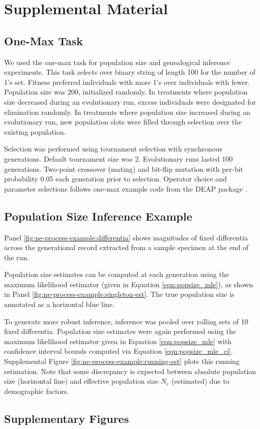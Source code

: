 \section{Supplemental Material}

\subsection{One-Max Task}
\label{sec:one-max}

We used the one-max task for population size and genealogical inference experiments.
This task selects over binary string of length 100 for the number of 1's set.
Fitness preferred individuals with more 1's over individuals with fewer.
Population size was 200, initialized randomly.
In treatments where population size decreased during an evolutionary run, excess individuals were designated for elimination randomly.
In treatments where population size increased during an evolutionary run,
new population slots were filled through selection over the existing population.

Selection was performed using tournament selection with synchronous generations.
Default tournament size was 2.
Evolutionary runs lasted 100 generations.
Two-point crossover (mating) and bit-flip mutation with per-bit probability 0.05 each generation prior to selection.
Operator choice and parameter selections follows one-max example code from the DEAP package \citep{fortin2012deap}.

\subsection{Population Size Inference Example}
\label{sec:population-size-inference-example}



Panel \ref{fig:ne-process-example:differentia} shows magnitudes of fixed differentia across the generational record extracted from a sample specimen at the end of the run.

Population size estimates can be computed at each generation using the maximum likelihood estimator (given in Equation \ref{eqn:popsize_mle}), as shown in Panel \ref{fig:ne-process-example:singleton-est}.
The true population size is annotated as a horizontal blue line.

To generate more robust inference, inference was pooled over rolling sets of 10 fixed differentia.
Population size estimates were again performed using the maximum likelihood estimator given in Equation \ref{eqn:popsize_mle} with confidence interval bounds computed via Equation \ref{eqn:popsize_mle_ci}.
Supplemental Figure \ref{fig:ne-process-example:running-est} plots this running estimation.
Note that some discrepancy is expected between absolute population size (horizontal line) and effective population size $N_e$ (estimated) due to demographic factors.



\subsection{Supplementary Figures}









% 
